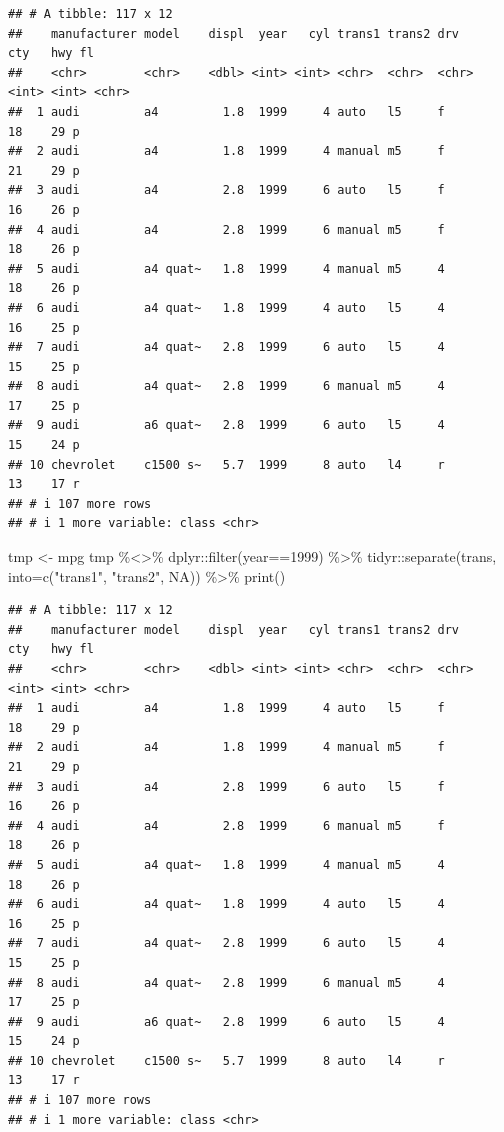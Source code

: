 \documentclass[
]{article}
\newenvironment{Shaded}{\begin{snugshade}}{\end{snugshade}}
\newcommand{\AttributeTok}[1]{\textcolor[rgb]{0.77,0.63,0.00}{#1}}
\newcommand{\ConstantTok}[1]{\textcolor[rgb]{0.00,0.00,0.00}{#1}}
\newcommand{\DecValTok}[1]{\textcolor[rgb]{0.00,0.00,0.81}{#1}}
\newcommand{\FunctionTok}[1]{\textcolor[rgb]{0.00,0.00,0.00}{#1}}
\newcommand{\NormalTok}[1]{#1}
\newcommand{\OtherTok}[1]{\textcolor[rgb]{0.56,0.35,0.01}{#1}}
\newcommand{\SpecialCharTok}[1]{\textcolor[rgb]{0.00,0.00,0.00}{#1}}
\newcommand{\StringTok}[1]{\textcolor[rgb]{0.31,0.60,0.02}{#1}}
\begin{document}
\begin{verbatim}
## # A tibble: 117 x 12
##    manufacturer model    displ  year   cyl trans1 trans2 drv     cty   hwy fl   
##    <chr>        <chr>    <dbl> <int> <int> <chr>  <chr>  <chr> <int> <int> <chr>
##  1 audi         a4         1.8  1999     4 auto   l5     f        18    29 p    
##  2 audi         a4         1.8  1999     4 manual m5     f        21    29 p    
##  3 audi         a4         2.8  1999     6 auto   l5     f        16    26 p    
##  4 audi         a4         2.8  1999     6 manual m5     f        18    26 p    
##  5 audi         a4 quat~   1.8  1999     4 manual m5     4        18    26 p    
##  6 audi         a4 quat~   1.8  1999     4 auto   l5     4        16    25 p    
##  7 audi         a4 quat~   2.8  1999     6 auto   l5     4        15    25 p    
##  8 audi         a4 quat~   2.8  1999     6 manual m5     4        17    25 p    
##  9 audi         a6 quat~   2.8  1999     6 auto   l5     4        15    24 p    
## 10 chevrolet    c1500 s~   5.7  1999     8 auto   l4     r        13    17 r    
## # i 107 more rows
## # i 1 more variable: class <chr>
\end{verbatim}

\begin{Shaded}
\begin{Highlighting}[]
\NormalTok{tmp }\OtherTok{\textless{}{-}}\NormalTok{ mpg}
\NormalTok{tmp }\SpecialCharTok{\%\textless{}\textgreater{}\%}
\NormalTok{  dplyr}\SpecialCharTok{::}\FunctionTok{filter}\NormalTok{(year}\SpecialCharTok{==}\DecValTok{1999}\NormalTok{) }\SpecialCharTok{\%\textgreater{}\%}
\NormalTok{  tidyr}\SpecialCharTok{::}\FunctionTok{separate}\NormalTok{(trans, }\AttributeTok{into=}\FunctionTok{c}\NormalTok{(}\StringTok{"trans1"}\NormalTok{, }\StringTok{"trans2"}\NormalTok{, }\ConstantTok{NA}\NormalTok{)) }\SpecialCharTok{\%\textgreater{}\%}
  \FunctionTok{print}\NormalTok{()}
\end{Highlighting}
\end{Shaded}

\begin{verbatim}
## # A tibble: 117 x 12
##    manufacturer model    displ  year   cyl trans1 trans2 drv     cty   hwy fl   
##    <chr>        <chr>    <dbl> <int> <int> <chr>  <chr>  <chr> <int> <int> <chr>
##  1 audi         a4         1.8  1999     4 auto   l5     f        18    29 p    
##  2 audi         a4         1.8  1999     4 manual m5     f        21    29 p    
##  3 audi         a4         2.8  1999     6 auto   l5     f        16    26 p    
##  4 audi         a4         2.8  1999     6 manual m5     f        18    26 p    
##  5 audi         a4 quat~   1.8  1999     4 manual m5     4        18    26 p    
##  6 audi         a4 quat~   1.8  1999     4 auto   l5     4        16    25 p    
##  7 audi         a4 quat~   2.8  1999     6 auto   l5     4        15    25 p    
##  8 audi         a4 quat~   2.8  1999     6 manual m5     4        17    25 p    
##  9 audi         a6 quat~   2.8  1999     6 auto   l5     4        15    24 p    
## 10 chevrolet    c1500 s~   5.7  1999     8 auto   l4     r        13    17 r    
## # i 107 more rows
## # i 1 more variable: class <chr>
\end{verbatim}
\end{document}
